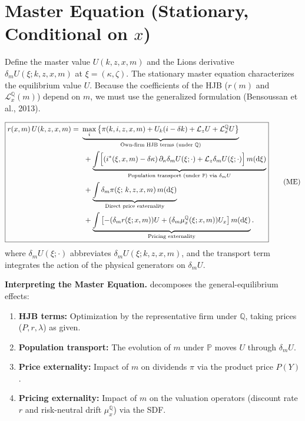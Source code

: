 \documentclass[11pt,letterpaper,oneside]{article}
\newcommand{\diff}{\mathrm{d}}
\newcommand{\Lz}{\mathcal{L}_z}
\newcommand{\LxQ}{\mathcal{L}_x^{\mathbb{Q}}}
\newcommand{\muxQ}{\mu_x^{\mathbb{Q}}}
\newcommand{\dmU}{\delta_m U}
\newcommand{\extbf}[1]{\textbf{#1}}
\begin{document}
\section[Master Equation (Stationary, Conditional on x)]{Master Equation (Stationary, Conditional on $x$)}

Define the master value $U(k,z,x,m)$ and the Lions derivative $\dmU(\xi;k,z,x,m)$ at $\xi=(\kappa,\zeta)$. The stationary master equation characterizes the equilibrium value $U$. Because the coefficients of the HJB ($r(m)$ and $\LxQ(m)$) depend on $m$, we must use the generalized formulation (Bensoussan et al., 2013).

\begin{equation}
\boxed{
\begin{aligned}
r(x,m)\,U(k,z,x,m)=\ &\underbrace{\max_{i}\big\{\pi(k,i,z,x,m)+U_k(i-\delta k)+\Lz U+\LxQ U\big\}}_{\text{Own-firm HJB terms (under $\mathbb{Q}$)}}\\
&\ +\underbrace{\int\Bigl[(i^*(\xi,x,m)-\delta\kappa)\,\partial_\kappa\dmU(\xi;\cdot)
+\Lz \dmU(\xi;\cdot)\Bigr]\,m(\diff \xi)}_{\text{Population transport (under $\mathbb{P}$) via }\dmU}\\
&\ +\underbrace{\int \delta_m \pi(\xi;\,k,z,x,m)\, m(\diff \xi)}_{\text{Direct price externality}}\\
&\ +\underbrace{\int \left[ -(\delta_m r(\xi;x,m)) U + (\delta_m \muxQ(\xi;x,m)) U_x \right] m(\diff \xi)}_{\text{Pricing externality}}.
\end{aligned}}
\tag{ME}\label{eq:ME}
\end{equation}
where $\dmU(\xi;\cdot)$ abbreviates $\dmU(\xi;k,z,x,m)$, and the transport term integrates the action of the physical generators on $\dmU$.

\begin{tcolorbox}[didacticstyle]
  \extbf{Interpreting the Master Equation.}  decomposes the general-equilibrium effects:
\begin{enumerate}[leftmargin=1.25em,label=(\roman*)]
  \item \textbf{HJB terms:} Optimization by the representative firm under $\mathbb{Q}$, taking prices ($P, r, \lambda$) as given.
  \item \textbf{Population transport:} The evolution of $m$ under $\mathbb{P}$ moves $U$ through $\dmU$.
  \item \textbf{Price externality:} Impact of $m$ on dividends $\pi$ via the product price $P(Y)$.
  \item \textbf{Pricing externality:} Impact of $m$ on the valuation operators (discount rate $r$ and risk-neutral drift $\muxQ$) via the SDF.
\end{enumerate}
\end{tcolorbox}
\end{document}
